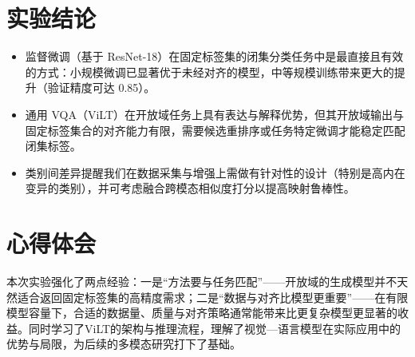 \section{实验结论}
\begin{itemize}
  \item 监督微调（基于 ResNet-18）在固定标签集的闭集分类任务中是最直接且有效的方式：小规模微调已显著优于未经对齐的模型，中等规模训练带来更大的提升（验证精度可达 0.85）。
  \item 通用 VQA（ViLT）在开放域任务上具有表达与解释优势，但其开放域输出与固定标签集合的对齐能力有限，需要候选重排序或任务特定微调才能稳定匹配闭集标签。 
  \item 类别间差异提醒我们在数据采集与增强上需做有针对性的设计（特别是高内在变异的类别），并可考虑融合跨模态相似度打分以提高映射鲁棒性。
\end{itemize}

\section{心得体会}
本次实验强化了两点经验：一是“方法要与任务匹配”——开放域的生成模型并不天然适合返回固定标签集的高精度需求；二是“数据与对齐比模型更重要”——在有限模型容量下，合适的数据量、质量与对齐策略通常能带来比更复杂模型更显著的收益。同时学习了ViLT的架构与推理流程，理解了视觉—语言模型在实际应用中的优势与局限，为后续的多模态研究打下了基础。
